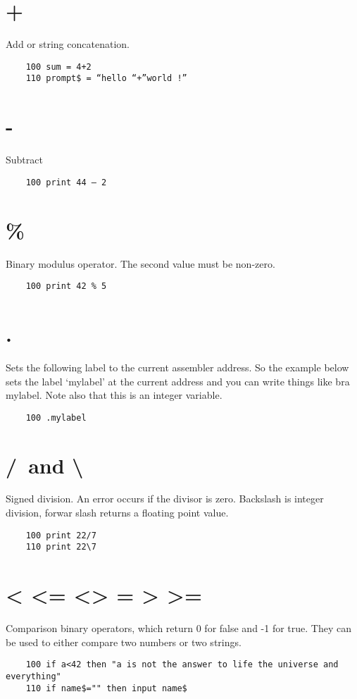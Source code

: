 \section*{+}
Add or string concatenation.
\example{}
\begin{verbatim}
	100 sum = 4+2
	110 prompt$ = “hello “+”world !”
\end{verbatim}

\section*{-}
Subtract
\example{}
\begin{verbatim}
	100 print 44 – 2
\end{verbatim}

\section*{\%}
Binary modulus operator. The second value must be non-zero.
\example{}
\begin{verbatim}
	100 print 42 % 5
\end{verbatim}

\section*{.}
Sets the following label to the current assembler address. So the example below sets the label ‘mylabel’ at the current address and you can write things like bra mylabel. Note also that this is an integer variable.
\example{}
\begin{verbatim}
	100 .mylabel
\end{verbatim}

\section*{\slash~and \textbackslash}
Signed division. An error occurs if the divisor is zero. Backslash is integer division, forwar slash returns a floating point value.
\example{}
\begin{verbatim}
	100 print 22/7
	110 print 22\7
\end{verbatim}

\section*{< <= <> = > >=}
Comparison binary operators, which return 0 for false and -1 for true. They can be used to either compare two numbers or two strings.
\example{}
\begin{verbatim}
	100 if a<42 then "a is not the answer to life the universe and everything"
	110 if name$="" then input name$
\end{verbatim}

